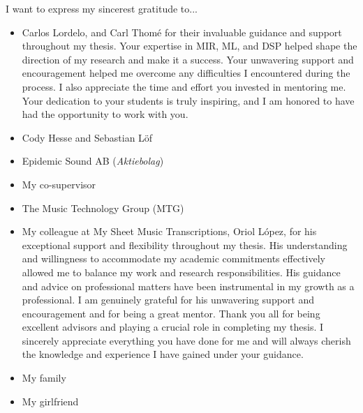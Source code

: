 

\begin{acknowledgement}

I want to express my sincerest gratitude to...

\begin{itemize}
\item Carlos Lordelo, and Carl Thomé for their invaluable guidance and support throughout my thesis. Your expertise in MIR, ML, and DSP helped shape the direction of my research and make it a success. Your unwavering support and encouragement helped me overcome any difficulties I encountered during the process. I also appreciate the time and effort you invested in mentoring me. Your dedication to your students is truly inspiring, and I am honored to have had the opportunity to work with you.
\vspace*{3mm}
\item Cody Hesse and Sebastian Löf
\vspace*{3mm}
\item Epidemic Sound AB (\textit{Aktiebolag})
\vspace*{3mm}
\item My co-supervisor
\vspace*{3mm}
\item The Music Technology Group (MTG)
\vspace*{3mm}
\item My colleague at My Sheet Music Transcriptions, Oriol López, for his exceptional support and flexibility throughout my thesis. His understanding and willingness to accommodate my academic commitments effectively allowed me to balance my work and research responsibilities. His guidance and advice on professional matters have been instrumental in my growth as a professional. I am genuinely grateful for his unwavering support and encouragement and for being a great mentor.
\vspace*{3mm}
Thank you all for being excellent advisors and playing a crucial role in completing my thesis. I sincerely appreciate everything you have done for me and will always cherish the knowledge and experience I have gained under your guidance.
\vspace*{3mm}
\item My family
\vspace*{3mm}
\item My girlfriend
\vspace*{3mm}
\end{itemize}

\newpage
\end{acknowledgement}